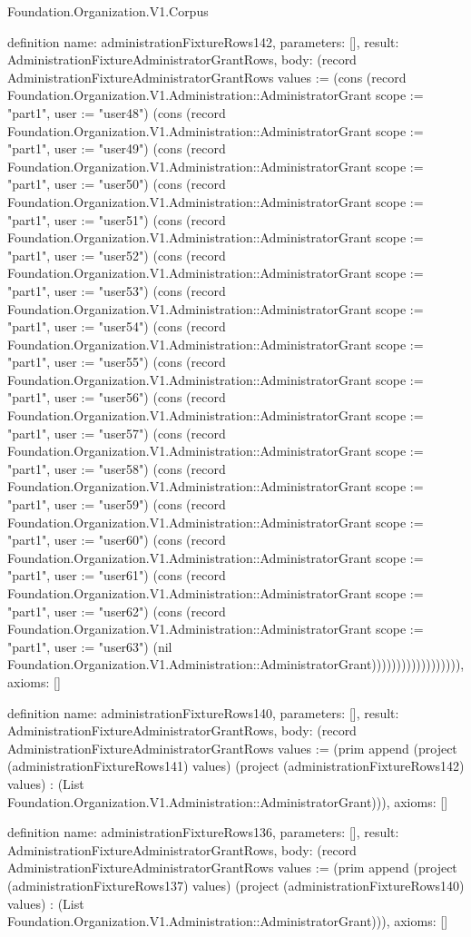 \begin{lexlean}{Foundation.Organization.V1.Corpus}
\begin{semanticmodule}
definition{
  name: administrationFixtureRows142,
  parameters: [],
  result: AdministrationFixtureAdministratorGrantRows,
  body: (record AdministrationFixtureAdministratorGrantRows {values := (cons (record Foundation.Organization.V1.Administration::AdministratorGrant {scope := "part1", user := "user48"}) (cons (record Foundation.Organization.V1.Administration::AdministratorGrant {scope := "part1", user := "user49"}) (cons (record Foundation.Organization.V1.Administration::AdministratorGrant {scope := "part1", user := "user50"}) (cons (record Foundation.Organization.V1.Administration::AdministratorGrant {scope := "part1", user := "user51"}) (cons (record Foundation.Organization.V1.Administration::AdministratorGrant {scope := "part1", user := "user52"}) (cons (record Foundation.Organization.V1.Administration::AdministratorGrant {scope := "part1", user := "user53"}) (cons (record Foundation.Organization.V1.Administration::AdministratorGrant {scope := "part1", user := "user54"}) (cons (record Foundation.Organization.V1.Administration::AdministratorGrant {scope := "part1", user := "user55"}) (cons (record Foundation.Organization.V1.Administration::AdministratorGrant {scope := "part1", user := "user56"}) (cons (record Foundation.Organization.V1.Administration::AdministratorGrant {scope := "part1", user := "user57"}) (cons (record Foundation.Organization.V1.Administration::AdministratorGrant {scope := "part1", user := "user58"}) (cons (record Foundation.Organization.V1.Administration::AdministratorGrant {scope := "part1", user := "user59"}) (cons (record Foundation.Organization.V1.Administration::AdministratorGrant {scope := "part1", user := "user60"}) (cons (record Foundation.Organization.V1.Administration::AdministratorGrant {scope := "part1", user := "user61"}) (cons (record Foundation.Organization.V1.Administration::AdministratorGrant {scope := "part1", user := "user62"}) (cons (record Foundation.Organization.V1.Administration::AdministratorGrant {scope := "part1", user := "user63"}) (nil Foundation.Organization.V1.Administration::AdministratorGrant)))))))))))))))))}),
  axioms: []
}

definition{
  name: administrationFixtureRows140,
  parameters: [],
  result: AdministrationFixtureAdministratorGrantRows,
  body: (record AdministrationFixtureAdministratorGrantRows {values := (prim append (project (administrationFixtureRows141) values) (project (administrationFixtureRows142) values) : (List Foundation.Organization.V1.Administration::AdministratorGrant))}),
  axioms: []
}

definition{
  name: administrationFixtureRows136,
  parameters: [],
  result: AdministrationFixtureAdministratorGrantRows,
  body: (record AdministrationFixtureAdministratorGrantRows {values := (prim append (project (administrationFixtureRows137) values) (project (administrationFixtureRows140) values) : (List Foundation.Organization.V1.Administration::AdministratorGrant))}),
  axioms: []
}


\end{semanticmodule}
\end{lexlean}
